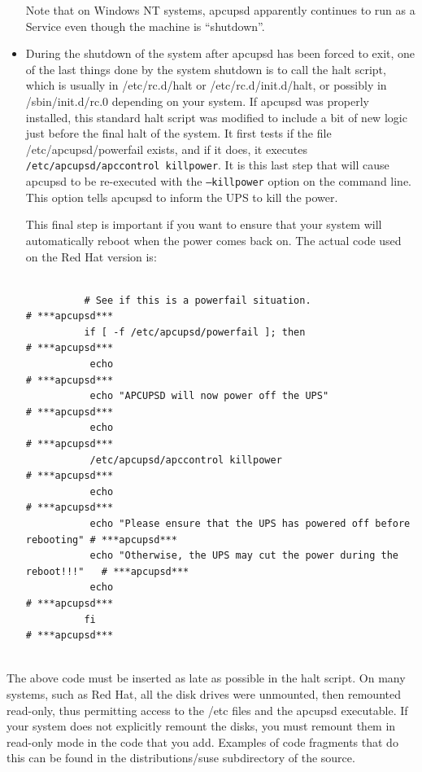 \begin{itemize}
Note that on Windows NT systems, apcupsd apparently continues to run as a
Service even though the machine is ``shutdown''.  
\item During the shutdown of the system after apcupsd has been forced to exit,
one of the last things done by the system shutdown is to call the halt script,
which is usually in /etc/rc.d/halt or /etc/rc.d/init.d/halt, or possibly in
/sbin/init.d/rc.0 depending on your system. If apcupsd was properly installed,
this standard halt script was modified to include a bit of new logic just
before the final halt of the system. It first tests if the file
/etc/apcupsd/powerfail exists, and if it does, it executes {\tt
/etc/apcupsd/apccontrol killpower}. It is this last step that will cause
apcupsd to be re-executed with the {\tt --killpower} option on the command
line. This option tells apcupsd to inform the UPS to kill the power.  

This final step is important if you want to ensure that your system will
automatically reboot when the power comes back on. The actual code used on the
Red Hat version is:  

\footnotesize
\begin{verbatim}
          
          # See if this is a powerfail situation.                             # ***apcupsd***
          if [ -f /etc/apcupsd/powerfail ]; then                              # ***apcupsd***
           echo                                                               # ***apcupsd***
           echo "APCUPSD will now power off the UPS"                          # ***apcupsd***
           echo                                                               # ***apcupsd***
           /etc/apcupsd/apccontrol killpower                                  # ***apcupsd***
           echo                                                               # ***apcupsd***
           echo "Please ensure that the UPS has powered off before rebooting" # ***apcupsd***
           echo "Otherwise, the UPS may cut the power during the reboot!!!"   # ***apcupsd***
           echo                                                               # ***apcupsd***
          fi                                                                  # ***apcupsd***
     
\end{verbatim}
\normalsize

\end{itemize}

The above code must be inserted as late as possible in the halt script. On
many systems, such as Red Hat, all the disk drives were unmounted, then
remounted read-only, thus permitting access to the /etc files and the apcupsd
executable. If your system does not explicitly remount the disks, you must
remount them in read-only mode in the code that you add. Examples of code
fragments that do this can be found in the distributions/suse subdirectory of
the source.  

